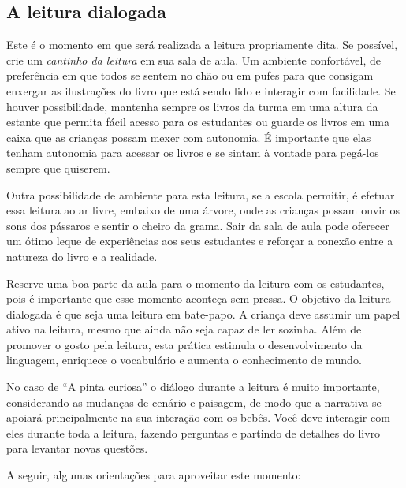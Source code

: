 \documentclass[11pt]{extarticle}
\begin{document}
\subsection{A leitura dialogada}
Este é o momento em que será realizada a leitura propriamente dita. 
Se possível, crie um \textit{cantinho da leitura} em sua sala de aula. Um 
ambiente confortável, de preferência em que todos se sentem no chão ou 
em pufes para que consigam enxergar as ilustrações do livro que está 
sendo lido e interagir com facilidade. Se houver possibilidade, mantenha 
sempre os livros da turma em uma altura da estante que permita fácil 
acesso para os estudantes ou guarde os livros em uma caixa que as crianças 
possam mexer com autonomia. É importante que elas tenham autonomia para 
acessar os livros e se sintam à vontade para pegá-los sempre que quiserem. 

Outra possibilidade de ambiente para esta leitura, se a escola permitir, 
é efetuar essa leitura ao ar livre, embaixo de uma árvore, onde as crianças 
possam ouvir os sons dos pássaros e sentir o cheiro da grama. Sair da sala 
de aula pode oferecer um ótimo leque de experiências aos seus estudantes e 
reforçar a conexão entre a natureza do livro e a realidade.  

Reserve uma boa parte da aula para o momento da leitura com os estudantes, 
pois é importante que esse momento aconteça sem pressa. O objetivo da 
leitura dialogada é que seja uma leitura em bate-papo. A criança deve 
assumir um papel ativo na leitura, mesmo que ainda não seja capaz de 
ler sozinha. Além de promover o gosto pela leitura, esta prática estimula 
o desenvolvimento da linguagem, enriquece o vocabulário e 
aumenta o conhecimento de mundo.

No caso de ``A pinta curiosa'' o diálogo durante a leitura é 
muito importante, considerando as mudanças de cenário e paisagem, 
de modo que a narrativa se apoiará principalmente na sua interação com os bebês. 
Você deve interagir com eles durante toda a 
leitura, fazendo perguntas e partindo de detalhes do livro para 
levantar novas questões. 

A seguir, algumas orientações para aproveitar este momento: 
\end{document}
